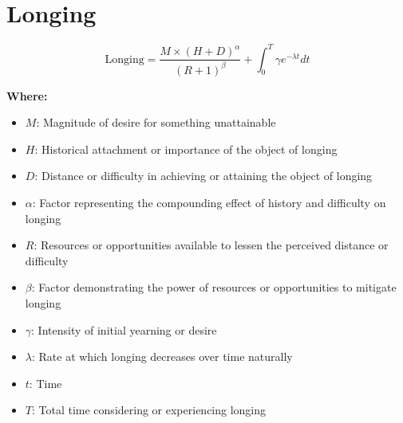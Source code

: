 \chapter{Longing}

\begin{equation}
\text{Longing} = \frac{M \times (H + D)^\alpha}{(R + 1)^\beta} + \int_{0}^{T} \gamma e^{-\lambda t} dt
\end{equation}

\textbf{Where:}

\begin{itemize}
    \item $M$: Magnitude of desire for something unattainable
    \item $H$: Historical attachment or importance of the object of longing
    \item $D$: Distance or difficulty in achieving or attaining the object of longing
    \item $\alpha$: Factor representing the compounding effect of history and difficulty on longing
    \item $R$: Resources or opportunities available to lessen the perceived distance or difficulty
    \item $\beta$: Factor demonstrating the power of resources or opportunities to mitigate longing
    \item $\gamma$: Intensity of initial yearning or desire
    \item $\lambda$: Rate at which longing decreases over time naturally
    \item $t$: Time
    \item $T$: Total time considering or experiencing longing
\end{itemize}